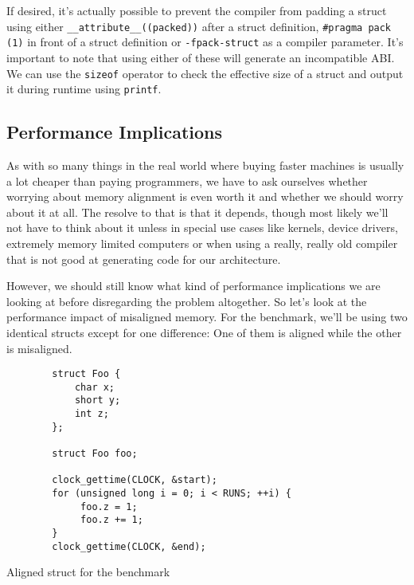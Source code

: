 \documentclass[a4paper,12pt]{scrartcl}
\begin{document}
If desired, it's actually possible to prevent the compiler from padding a struct using either
\verb|__attribute__((packed))| after a struct definition, \verb|#pragma pack (1)| in
front of a struct definition or \verb|-fpack-struct| as a compiler parameter. It's important to
note that using either of these will generate an incompatible ABI.
We can use the \verb|sizeof| operator to check the effective size of a struct and output it during
runtime using \verb|printf|.

\subsection{Performance Implications}
As with so many things in the real world where buying faster machines is usually a lot cheaper than
paying programmers, we have to ask ourselves whether worrying about memory alignment is even worth
it and whether we should worry about it at all. The resolve to that is that it depends, though most likely
we'll not have to think about it unless in special use cases like kernels, device drivers,
extremely memory limited computers or when using a really, really old compiler that is not good at
generating code for our architecture.

However, we should still know what kind of performance implications we are looking at before
disregarding the problem altogether. So let's look at the performance impact of misaligned memory.
For the benchmark, we'll be using two identical structs except for one difference: One of them is
aligned while the other is misaligned.
\begin{listing}[H]
    \begin{verbatim}
        struct Foo {
            char x;
            short y;
            int z;
        };

        struct Foo foo;

        clock_gettime(CLOCK, &start);
        for (unsigned long i = 0; i < RUNS; ++i) {
             foo.z = 1;
             foo.z += 1;
        }
        clock_gettime(CLOCK, &end);
    \end{verbatim}
    \label{struct-bench-aligned}
    \caption{Aligned struct for the benchmark}
\end{listing}
\end{document}
